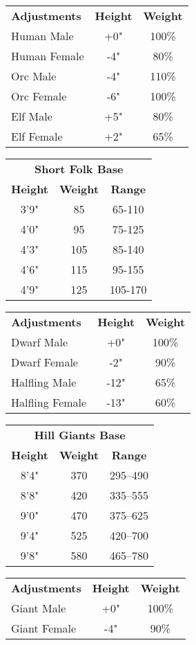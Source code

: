 \begin{multicols*}{3}
\begin{tabular}{lcc}
\textbf{Adjustments} & \textbf{Height} &\textbf{Weight} \\
Human Male	& +0"	& 100\% \\
Human Female	& -4"	& 80\% \\
Orc Male	& -4"	& 110\% \\
Orc Female	& -6"	& 100\% \\
Elf Male	& +5"	& 80\% \\
Elf Female	& +2"	& 65\% \\
\end{tabular}

\begin{tabular}{ccc}
\multicolumn{3}{c}{\textbf{Short Folk Base}} \\
\textbf{Height} & \textbf{Weight} & \textbf{Range} \\
3'9"	& 85	& 65-110 \\
4'0"	& 95	& 75-125 \\
4'3"	& 105	& 85-140 \\
4'6"	& 115	& 95-155 \\
4'9"	& 125	& 105-170 \\
\end{tabular}

\begin{tabular}{lcc}
\textbf{Adjustments} & \textbf{Height} &\textbf{Weight} \\
Dwarf Male	& +0"	& 100\% \\
Dwarf Female	& -2"	& 90\% \\
Halfling Male	& -12"	& 65\% \\
Halfling Female	& -13"	& 60\% \\
\end{tabular}

\begin{tabular}{ccc}
\multicolumn{3}{c}{\textbf{Hill Giants Base}} \\
\textbf{Height} & \textbf{Weight} & \textbf{Range} \\
8'4"	& 370	& 295--490 \\
8'8"	& 420	& 335--555 \\
9'0"	& 470	& 375--625 \\
9'4"	& 525	& 420--700 \\
9'8"	& 580	& 465--780 \\
\end{tabular}

\begin{tabular}{lcc}
\textbf{Adjustments} & \textbf{Height} &\textbf{Weight} \\
Giant Male	& +0"	& 100\% \\
Giant Female	&  -4"	&  90\% \\
\end{tabular}


\end{multicols*}
